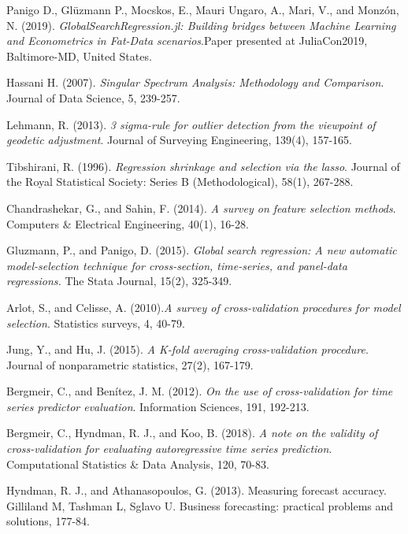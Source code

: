 \documentclass{article}
\begin{document}
  
\begin{thebibliography}{1}

Panigo D., Glüzmann P., Mocskos, E., Mauri Ungaro, A., Mari, V., and Monzón, N. (2019). \textit{GlobalSearchRegression.jl: Building bridges between Machine Learning and Econometrics in Fat-Data scenarios}.Paper presented at JuliaCon2019, Baltimore-MD, United States.

Hassani H. (2007). \textit{Singular Spectrum Analysis: Methodology and Comparison}. Journal of Data Science, 5, 239-257.

Lehmann, R. (2013). \textit{3 sigma-rule for outlier detection from the viewpoint of geodetic adjustment}. Journal of Surveying Engineering, 139(4), 157-165.

Tibshirani, R. (1996). \textit{Regression shrinkage and selection via the lasso}. Journal of the Royal Statistical Society: Series B (Methodological), 58(1), 267-288.

Chandrashekar, G., and Sahin, F. (2014). \textit{A survey on feature selection methods}. Computers & Electrical Engineering, 40(1), 16-28.

Gluzmann, P., and Panigo, D. (2015). \textit{Global search regression: A new automatic model-selection technique for cross-section, time-series, and panel-data regressions.} The Stata Journal, 15(2), 325-349.

Arlot, S., and Celisse, A. (2010).\textit{A survey of cross-validation procedures for model selection}. Statistics surveys, 4, 40-79.

Jung, Y., and Hu, J. (2015). \textit{A K-fold averaging cross-validation procedure}. Journal of nonparametric statistics, 27(2), 167-179.

Bergmeir, C., and Benítez, J. M. (2012). \textit{On the use of cross-validation for time series predictor evaluation}. Information Sciences, 191, 192-213.

Bergmeir, C., Hyndman, R. J., and Koo, B. (2018). \textit{A note on the validity of cross-validation for evaluating autoregressive time series prediction}. Computational Statistics & Data Analysis, 120, 70-83.

Hyndman, R. J., and Athanasopoulos, G. (2013). Measuring forecast accuracy. Gilliland M, Tashman L, Sglavo U. Business forecasting: practical problems and solutions, 177-84.

\end{thebibliography}
\end{document}
